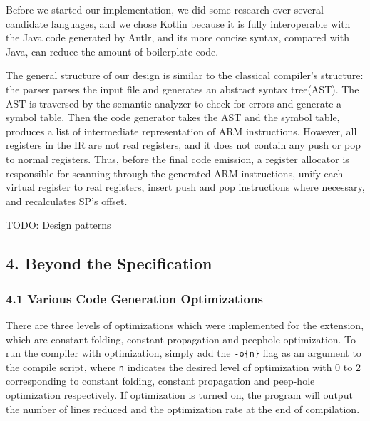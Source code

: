 \documentclass[10pt,a4paper]{report}
\begin{document}
  Before we started our implementation, we did some research over several
  candidate languages, and we chose Kotlin because it is fully interoperable
  with the Java code generated by Antlr, and its more concise syntax, compared
  with Java, can reduce the amount of boilerplate code.

  The general structure of our design is similar to the classical compiler's
  structure: the parser parses the input file and generates an abstract syntax
  tree(AST). The AST is traversed by the semantic analyzer to check for errors
  and generate a symbol table. Then the code generator takes the AST and the
  symbol table, produces a list of intermediate representation of ARM
  instructions. However, all registers in the IR are not real registers, and it
  does not contain any push or pop to normal registers. Thus, before the final
  code emission, a register allocator is responsible for scanning through the
  generated ARM instructions, unify each virtual register to real registers,
  insert push and pop instructions where necessary, and recalculates SP's offset.

  TODO: Design patterns

  \subsection*{4. Beyond the Specification}

  \subsubsection*{4.1 Various Code Generation Optimizations}
  There are three levels of optimizations which were implemented for the
  extension, which are constant folding, constant propagation and peephole
  optimization. To run the compiler with optimization, simply add the
  \texttt{-o\{n\}} flag as an argument to the compile script, where \texttt{n}
  indicates the desired level of optimization with 0 to 2 corresponding to
  constant folding, constant propagation and peep-hole optimization respectively.
  If optimization is turned on, the program will output the number of lines
  reduced and the optimization rate at the end of compilation.
\end{document}
